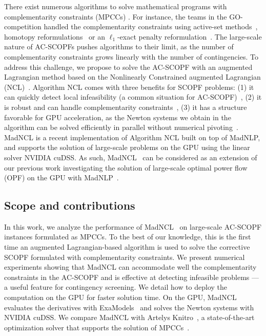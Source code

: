 \documentclass{IEEEtran4PSCC}
\begin{document}
There exist numerous algorithms to solve mathematical programs with complementarity constraints (MPCCs) \cite{nurkanovic2024}.
For instance, the teams in the GO-competition handled the complementarity constraints
using active-set methods~\cite{curtis2023decomposition}, homotopy reformulations~\cite{gholami2023admm,petra2023surrogate} or an $\ell_1$-exact penalty reformulation~\cite{leyffer2006interior}.
The large-scale nature of AC-SCOPFs pushes algorithms to their limit, as the number
of complementarity constraints grows linearly with the number of contingencies.
To address this challenge, we propose to solve the AC-SCOPF with an augmented Lagrangian
method based on the Nonlinearly Constrained augmented Lagrangian (NCL)~\cite{ma2017stabilized,montoison2025madncl}. Algorithm NCL comes with three benefits for SCOPF problems:
(1) it can quickly detect local infeasibility (a common situation for AC-SCOPF)~\cite{chiche2016augmented},
(2) it is robust and can handle complementarity constraints~\cite{izmailov2012global},
(3) it has a structure favorable for GPU acceleration, as the Newton systems we obtain
in the algorithm can be solved efficiently in parallel without numerical pivoting~\cite{montoison2025madncl}.
MadNCL is a recent implementation of Algorithm NCL built on top of MadNLP, and supports
the solution of large-scale problems on the GPU using the linear solver NVIDIA cuDSS.
As such, MadNCL~\cite{montoison2025madncl} can be considered as an extension of our previous work investigating
the solution of large-scale optimal power flow (OPF) on the GPU with MadNLP~\cite{shin2024accelerating}.


\subsection{Scope and contributions}
In this work, we analyze the performance of MadNCL~\cite{montoison2025madncl}
on large-scale AC-SCOPF instances formulated as MPCCs.
To the best of our knowledge, this is the first time an augmented Lagrangian-based algorithm is used to solve the corrective SCOPF formulated with complementarity constraints. We present numerical
experiments showing that MadNCL can accommodate well the complementarity constraints in the AC-SCOPF and
is effective at detecting infeasible problems --- a useful feature for contingency screening.
We detail how to deploy the computation on the GPU for faster solution time.
On the GPU, MadNCL evaluates the derivatives with ExaModels~\cite{shin2024accelerating} and solves the Newton systems with NVIDIA cuDSS.
We compare MadNCL with Artelys Knitro~\cite{waltz2006interior}, a state-of-the-art optimization
solver that supports the solution of MPCCs~\cite{leyffer2006interior}.
\end{document}

